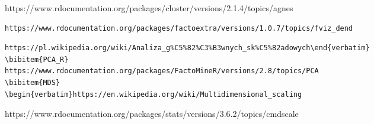 \documentclass[12pt, a4paper]{article}\usepackage[]{graphicx}\usepackage[]{xcolor}
\begin{document}
\begin{thebibliography}{9}
https://www.rdocumentation.org/packages/cluster/versions/2.1.4/topics/agnes
\begin{verbatim}https://www.rdocumentation.org/packages/factoextra/versions/1.0.7/topics/fviz_dend\end{verbatim}
\begin{verbatim}https://pl.wikipedia.org/wiki/Analiza_g%C5%82%C3%B3wnych_sk%C5%82adowych\end{verbatim}
\bibitem{PCA_R}
https://www.rdocumentation.org/packages/FactoMineR/versions/2.8/topics/PCA
\bibitem{MDS}
\begin{verbatim}https://en.wikipedia.org/wiki/Multidimensional_scaling\end{verbatim}
https://www.rdocumentation.org/packages/stats/versions/3.6.2/topics/cmdscale
\end{thebibliography}
\end{document}
